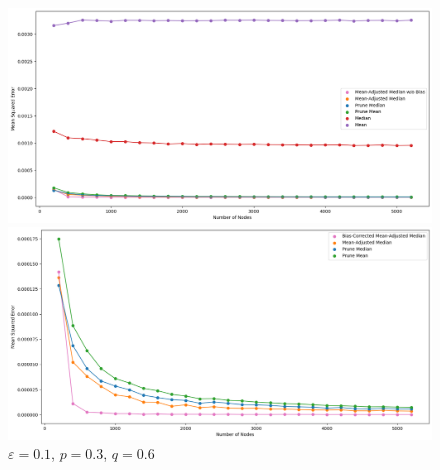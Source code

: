 \documentclass[10pt,onecolumn,letterpaper]{article}
\newcommand{\eps}{\varepsilon}
\begin{document}
\begin{figure}[ht]
    \centering
    \begin{minipage}{0.45\textwidth}
        \centering
        \includegraphics[width=\linewidth]{img/emperic.png}
        \caption{$\eps=0.1$, $p = 0.3$, $q = 0.6$}
        \label{fig:result1}
    \end{minipage} \hfill
    \begin{minipage}{0.45\textwidth}
        \centering
        \includegraphics[width=\linewidth]{img/emperic2.png}
        \caption{$\eps = 0.1$, $p = 0.3$, $q = 0.6$}
        \label{fig:result2}
    \end{minipage}
\end{figure}
\end{document}
